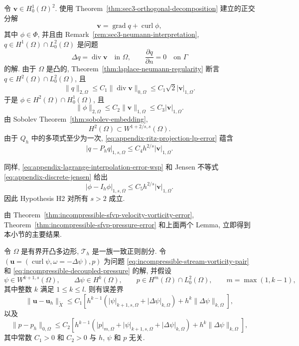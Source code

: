 \begin{Proof}
令 $\mathbf v\in H_0^1(\Omega)^2$.
使用 Theorem~\ref{thm:sec3-orthogonal-decomposition}
建立的正交分解
\[
\mathbf v=\operatorname{grad}q+\operatorname{curl}\phi,
\]
其中 $\phi\in\Phi$, 并且由
Remark~\ref{rem:sec3-neumann-interpretation},
$q\in H^1(\Omega)\cap L_0^2(\Omega)$ 是问题
\[
\Delta q=\operatorname{div}\mathbf v\quad\text{in }\Omega,
\qquad
\frac{\partial q}{\partial n}=0\quad\text{on }\Gamma
\]
的解.
由于 $\Omega$ 是凸的,
Theorem~\ref{thm:laplace-neumann-regularity}
断言 $q\in H^2(\Omega)\cap L_0^2(\Omega)$, 且
\[
\|q\|_{2,\Omega}
\leq C_1\|\operatorname{div}\mathbf v\|_{0,\Omega}
\leq C_1\sqrt2|\mathbf v|_{1,\Omega}.
\]
于是 $\phi\in H^2(\Omega)\cap H_0^1(\Omega)$, 且
\[
\|\phi\|_{2,\Omega}
\leq C_2\|\mathbf v\|_{1,\Omega}
\leq C_3|\mathbf v|_{1,\Omega}.
\]
由 Sobolev Theorem~\ref{thm:sobolev-embedding},
\[
H^2(\Omega)\subset W^{1+2/s,s}(\Omega).
\]
由于 $Q_h$ 中的多项式至少为一次,
\eqref{eq:appendix-ritz-projection-lp-error}
蕴含
\[
|q-P_hq|_{1,s,\Omega}
\leq C_4h^{2/s}|\mathbf v|_{1,\Omega}.
\]

同样, \eqref{eq:appendix-lagrange-interpolation-error-wsp}
和 Jensen 不等式 \eqref{eq:appendix-discrete-jensen}
给出
\[
|\phi-I_h\phi|_{1,s,\Omega}
\leq C_5h^{2/s}|\mathbf v|_{1,\Omega}.
\]
因此 Hypothesis H2 对所有 $s>2$ 成立.
\end{Proof}

由 Theorem~\ref{thm:incompressible-sfvp-velocity-vorticity-error},
Theorem~\ref{thm:incompressible-sfvp-pressure-error}
和上面两个 Lemma, 立即得到本小节的主要结果.

\begin{Theorem}\label{thm:incompressible-sfvp-standard-fe-error}
令 $\Omega$ 是有界开凸多边形,
$\mathcal T_h$ 是一族一致正则剖分.
令
$(\mathbf u=(\operatorname{curl}\psi,\omega=-\Delta\psi),p)$
为问题 \eqref{eq:incompressible-stream-vorticity-pair}
和 \eqref{eq:incompressible-decoupled-pressure} 的解, 并假设
\begin{equation}\label{eq:incompressible-sfvp-standard-regularity}
\psi\in W^{k+1,s}(\Omega),
\qquad
\Delta\psi\in H^k(\Omega),
\qquad
p\in H^m(\Omega)\cap L_0^2(\Omega),
\qquad
m=\max(1,k-1),
\end{equation}
其中整数 $k$ 满足 $1\leq k\leq l$.
则有误差界
\begin{equation}\label{eq:incompressible-sfvp-standard-velocity-error}
\|\mathbf u-\mathbf u_h\|_{\widetilde X}
\leq C_1\left[
h^{k-1}\left(|\psi|_{k+1,s,\Omega}+|\Delta\psi|_{k,\Omega}\right)
+h^k\|\Delta\psi\|_{k,\Omega}
\right],
\end{equation}
以及
\begin{equation}\label{eq:incompressible-sfvp-standard-pressure-error}
\|p-p_h\|_{0,\Omega}
\leq C_2\left[
h^{k-1}\left(|p|_{m,\Omega}+|\psi|_{k+1,s,\Omega}
+|\Delta\psi|_{k,\Omega}\right)
+h^k\|\Delta\psi\|_{k,\Omega}
\right],
\end{equation}
其中常数 $C_1>0$ 和 $C_2>0$ 与 $h$, $\psi$ 和 $p$ 无关.
\end{Theorem}

